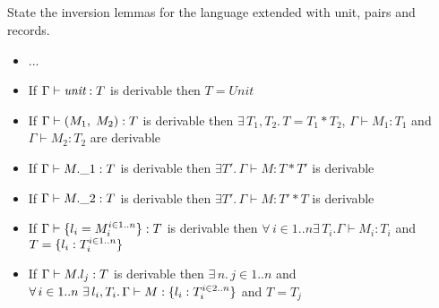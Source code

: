 \subsection{}

State the inversion lemmas for the language extended with unit, pairs and records.

\begin{itemize}
\item ...
\item If $\Gamma \vdash \emph{unit}: T$ is derivable then $T = Unit$
\item If $\Gamma \vdash (M_1,\;M_2): T$ is derivable then
  $\exists\,T_1, T_2.\, T = T_1 \ast T_2$, $\Gamma \vdash M_1: T_1$ and
  $\Gamma \vdash M_2: T_2$ are derivable
\item If $\Gamma \vdash M.\_1: T$ is derivable then
  $\exists T'.\, \Gamma \vdash M: T \ast T'$ is derivable
\item If $\Gamma \vdash M.\_2: T$ is derivable then
  $\exists T'.\, \Gamma \vdash M: T' \ast T$ is derivable
\item If $\Gamma \vdash \{l_i=M_i^{i \in 1..n}\}: T$ is derivable
  then $\forall\, i \in 1..n \exists\, T_i. \Gamma \vdash M_i: T_i$ and
  $T = \{l_i: T_i^{i \in 1..n}\}$
\item If $\Gamma \vdash M.l_j: T$ is derivable then $\exists\, n.\,j \in 1..n$ and
  $\forall\, i \in 1..n\ \exists\, l_i, T_i.\,\Gamma \vdash M: \{l_i: T_i^{i \in 2..n}\}$
  and $T = T_j$
\end{itemize}

